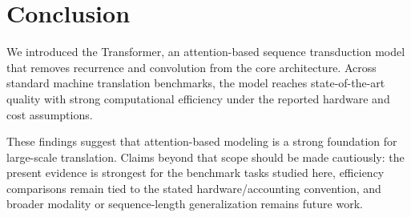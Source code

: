 \section{Conclusion}

We introduced the Transformer, an attention-based sequence transduction model that removes recurrence and convolution from the core architecture. Across standard machine translation benchmarks, the model reaches state-of-the-art quality with strong computational efficiency under the reported hardware and cost assumptions.

These findings suggest that attention-based modeling is a strong foundation for large-scale translation. Claims beyond that scope should be made cautiously: the present evidence is strongest for the benchmark tasks studied here, efficiency comparisons remain tied to the stated hardware/accounting convention, and broader modality or sequence-length generalization remains future work.
